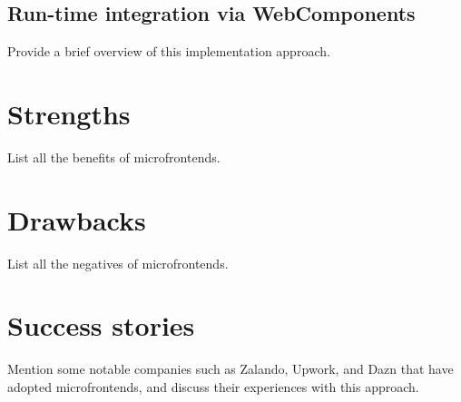 \subsection{Run-time integration via WebComponents}
Provide a brief overview of this implementation approach.

\section{Strengths}
List all the benefits of microfrontends.

\section{Drawbacks}
List all the negatives of microfrontends.

\section{Success stories}
Mention some notable companies such as Zalando, Upwork, and Dazn that have adopted microfrontends, and discuss their experiences with this approach.